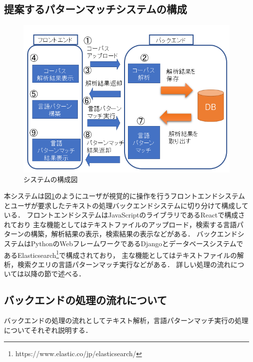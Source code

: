 \documentclass{FITpaper}
\begin{document}
\subsection{提案するパターンマッチシステムの構成}

\begin{figure}[htbp]
  \centering
  \includegraphics[scale=0.4]{fig/system_fig.png}
  \caption{システムの構成図}
  \label{fig:sys}
\end{figure}

本システムは図\ref{fig:sys}のようにユーザが視覚的に操作を行うフロントエンドシステムとユーザが要求したテキストの処理バックエンドシステムに切り分けて構成している．
フロントエンドシステムはJavaScriptのライブラリであるReactで構成されており
主な機能としてはテキストファイルのアップロード，検索する言語パターンの構築，解析結果の表示，検索結果の表示などがある．
バックエンドシステムはPythonのWebフレームワークであるDjangoとデータベースシステムであるElasticsearch\footnote{https://www.elastic.co/jp/elasticsearch/}で構成されており，
主な機能としてはテキストファイルの解析，検索クエリの言語パターンマッチ実行などがある．
詳しい処理の流れについては以降の節で述べる．

\subsection{バックエンドの処理の流れについて}
バックエンドの処理の流れとしてテキスト解析，言語パターンマッチ実行の処理についてそれぞれ説明する．
\end{document}
